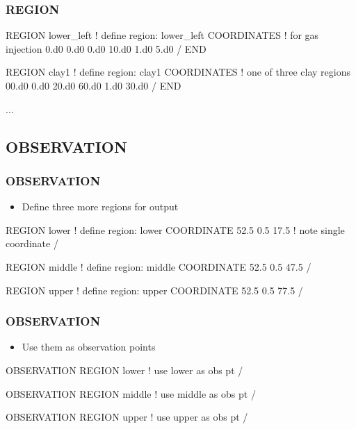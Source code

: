 \documentclass{beamer}
\newcommand\redcomment[1]{{{\color{red} #1}}}
\newcommand\bluecomment[1]{{{\color{blue} #1}}}
\newcommand\greencomment[1]{{{\color{green} #1}}}
\begin{document}
\begin{frame}[fragile]\frametitle{REGION}

\begin{semiverbatim}\small
REGION lower_left        \bluecomment{! define region:} \greencomment{lower_left}
  COORDINATES            \bluecomment{! for gas injection}
    0.d0 0.d0 0.d0
    10.d0 1.d0 5.d0
  /
END

REGION clay1             \bluecomment{! define region:} \greencomment{clay1}
  COORDINATES            \bluecomment{! one of three clay regions}
    00.d0 0.d0 20.d0
    60.d0 1.d0 30.d0
  /
END

...

\end{semiverbatim}
  
\end{frame}
\subsection{OBSERVATION}

\begin{frame}[fragile]\frametitle{OBSERVATION}
\begin{itemize}
  \item{Define three more regions for \redcomment{output}}
\end{itemize}

\begin{semiverbatim}\small
REGION lower \bluecomment{! define region:} \greencomment{lower}
  COORDINATE 52.5 0.5 17.5 \bluecomment{! note single coordinate}
/

REGION middle \bluecomment{! define region:} \greencomment{middle}
  COORDINATE 52.5 0.5 47.5
/

REGION upper \bluecomment{! define region:} \greencomment{upper}
  COORDINATE 52.5 0.5 77.5
/
\end{semiverbatim}
\end{frame}

\begin{frame}[fragile]\frametitle{OBSERVATION}
\begin{itemize}
  \item{Use them as \redcomment{observation points}}
\end{itemize}

\begin{semiverbatim}\small
OBSERVATION
  REGION lower \bluecomment{! use} \greencomment{lower} \bluecomment{as obs pt}
/

OBSERVATION
  REGION middle \bluecomment{! use} \greencomment{middle} \bluecomment{as obs pt}
/

OBSERVATION
  REGION upper \bluecomment{! use} \greencomment{upper} \bluecomment{as obs pt}
/
\end{semiverbatim}
\end{frame}
\end{document}
